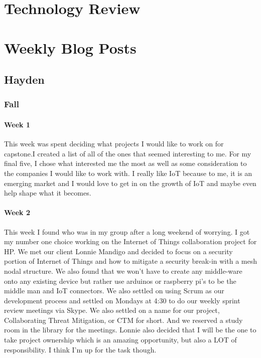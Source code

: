 \documentclass[draftclsnofoot, onecolumn, compsoc, 10pt]{IEEEtran}
\begin{document}
\section{Technology Review}

\section{Weekly Blog Posts}
\subsection{Hayden}
\subsubsection{Fall}
\paragraph{Week 1}
This week was spent deciding what projects I would like to work on for capstone.I created a list of all of the ones that seemed interesting to me. For my final five, I chose what interested me the most as well as some consideration to the companies I would like to work with.  I really like IoT because to me, it is an emerging market and I would love to get in on the growth of IoT and maybe even help shape what it becomes. 
\paragraph{Week 2}
This week I found who was in my group after a long weekend of worrying. I got my number one choice working on the Internet of Things collaboration project for HP.  We met our client Lonnie Mandigo and decided to focus on a security portion of Internet of Things and how to mitigate a security break-in with a mesh nodal structure.  We also found that we won't have to create any middle-ware onto any existing device but rather use arduinos or raspberry pi's to be the middle man and IoT connectors. We also settled on using Scrum as our development process and settled on Mondays at 4:30 to do our weekly sprint review meetings via Skype.  We also settled on a name for our project, Collaborating Threat Mitigation, or CTM for short.  And we reserved a study room in the library for the meetings. Lonnie also decided that I will be the one to take project ownership which is an amazing opportunity, but also a LOT of responsibility. I think I'm up for the task though. 
\end{document}

